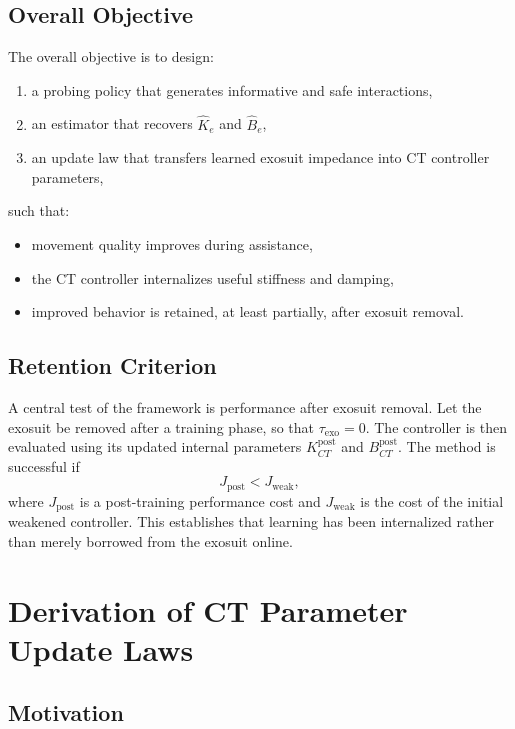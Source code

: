 \documentclass[11pt]{article}
\begin{document}
\subsection{Overall Objective}

The overall objective is to design:
\begin{enumerate}
    \item a probing policy that generates informative and safe interactions,
    \item an estimator that recovers \(\hat{K}_e\) and \(\hat{B}_e\),
    \item an update law that transfers learned exosuit impedance into CT controller parameters,
\end{enumerate}
such that:
\begin{itemize}
    \item movement quality improves during assistance,
    \item the CT controller internalizes useful stiffness and damping,
    \item improved behavior is retained, at least partially, after exosuit removal.
\end{itemize}

\subsection{Retention Criterion}

A central test of the framework is performance after exosuit removal. Let the exosuit be removed after a training phase, so that \(\tau_{\mathrm{exo}}=0\). The controller is then evaluated using its updated internal parameters \(K_{CT}^{\mathrm{post}}\) and \(B_{CT}^{\mathrm{post}}\). The method is successful if
\begin{equation}
J_{\mathrm{post}} < J_{\mathrm{weak}},
\end{equation}
where \(J_{\mathrm{post}}\) is a post-training performance cost and \(J_{\mathrm{weak}}\) is the cost of the initial weakened controller. This establishes that learning has been internalized rather than merely borrowed from the exosuit online.

\section{Derivation of CT Parameter Update Laws}

\subsection{Motivation}
\end{document}

